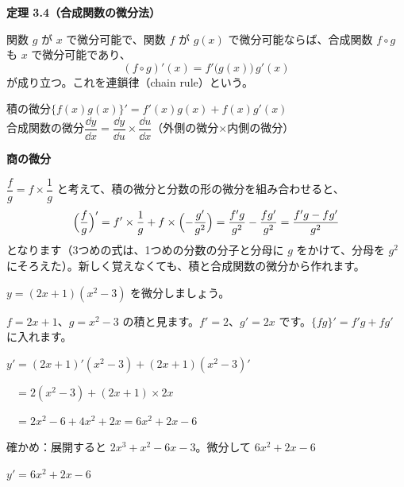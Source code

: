 \begin{senmonsho}[大学の教科書ふうの書き方]
\begin{bkhonbun}
\par\addvspace{3pt}\textbf{定理 3.4（合成関数の微分法）}\par\noindent 関数 $g$ が $x$ で微分可能で、関数 $f$ が $g(x)$ で微分可能ならば、合成関数 $f\circ g$ も $x$ で微分可能であり、
\[ (f\circ g)'(x)=f'\bigl(g(x)\bigr)\,g'(x) \tag{3.7} \]
が成り立つ。これを連鎖律（chain rule）という。
\end{bkhonbun}
\end{senmonsho}

\begin{taisetsu}
積の微分\quad $\{f(x)g(x)\}'=f'(x)g(x)+f(x)g'(x)$\\[2pt]
合成関数の微分\quad $\dfrac{\dd y}{\dd x}=\dfrac{\dd y}{\dd u}\times\dfrac{\dd u}{\dd x}$\quad（外側の微分×内側の微分）
\end{taisetsu}

\begin{motto}[4]
\textbf{商の微分}\par
$\dfrac{f}{g}=f\times\dfrac{1}{g}$ と考えて、積の微分と分数の形の微分を組み合わせると、
\[ \Bigl(\frac{f}{g}\Bigr)'=f'\times\frac{1}{g}+f\times\Bigl(-\frac{g'}{g^2}\Bigr)=\frac{f'g}{g^2}-\frac{fg'}{g^2}=\frac{f'g-fg'}{g^2} \]
となります（3つめの式は、1つめの分数の分子と分母に $g$ をかけて、分母を $g^2$ にそろえた）。新しく覚えなくても、積と合成関数の微分から作れます。
\end{motto}

\begin{kotoba}
\small
{}
\end{kotoba}


\begin{reidai}[積の微分]
$y=(2x+1)(x^2-3)$ を微分しましょう。\par
\kangaekata $f=2x+1$、$g=x^2-3$ の積と見ます。$f'=2$、$g'=2x$ です。$\{fg\}'=f'g+fg'$ に入れます。\par
\shiki $y'=(2x+1)'(x^2-3)+(2x+1)(x^2-3)'$\par
\hspace*{2.6\zw}$\phantom{y'}=2(x^2-3)+(2x+1)\times2x$\par
\hspace*{2.6\zw}$\phantom{y'}=2x^2-6+4x^2+2x=6x^2+2x-6$\par
\hspace*{2.6\zw}確かめ：展開すると $2x^3+x^2-6x-3$。微分して $6x^2+2x-6$\par
\kotae $y'=6x^2+2x-6$
\end{reidai}

